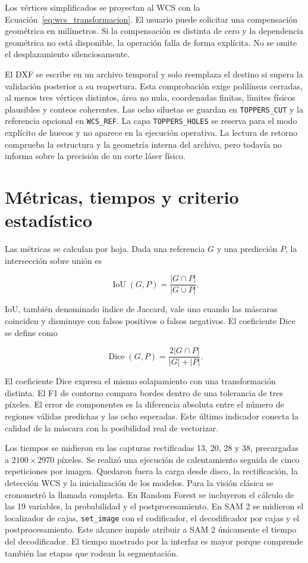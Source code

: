 Los vértices simplificados se proyectan al WCS con la Ecuación~\ref{eq:wcs_transformacion}. El usuario puede solicitar una compensación geométrica en milímetros. Si la compensación es distinta de cero y la dependencia geométrica no está disponible, la operación falla de forma explícita. No se omite el desplazamiento silenciosamente.

El DXF se escribe en un archivo temporal y solo reemplaza el destino si supera la validación posterior a su reapertura. Esta comprobación exige polilíneas cerradas, al menos tres vértices distintos, área no nula, coordenadas finitas, límites físicos plausibles y conteos coherentes. Las ocho siluetas se guardan en \texttt{TOPPERS\_CUT} y la referencia opcional en \texttt{WCS\_REF}. La capa \texttt{TOPPERS\_HOLES} se reserva para el modo explícito de huecos y no aparece en la ejecución operativa. La lectura de retorno comprueba la estructura y la geometría interna del archivo, pero todavía no informa sobre la precisión de un corte láser físico.

\section{Métricas, tiempos y criterio estadístico}

Las métricas se calculan por hoja. Dada una referencia $G$ y una predicción $P$, la intersección sobre unión es

\begin{equation}
\operatorname{IoU}(G,P)=\frac{|G\cap P|}{|G\cup P|}.
\label{eq:iou}
\end{equation}

IoU, también denominado índice de Jaccard, vale uno cuando las máscaras coinciden y disminuye con falsos positivos o falsos negativos. El coeficiente Dice se define como

\begin{equation}
\operatorname{Dice}(G,P)=\frac{2|G\cap P|}{|G|+|P|}.
\label{eq:dice}
\end{equation}

El coeficiente Dice expresa el mismo solapamiento con una transformación distinta. El F1 de contorno compara bordes dentro de una tolerancia de tres píxeles. El error de componentes es la diferencia absoluta entre el número de regiones válidas predichas y las ocho esperadas. Este último indicador conecta la calidad de la máscara con la posibilidad real de vectorizar.

Los tiempos se midieron en las capturas rectificadas 13, 20, 28 y 38, precargadas a $2100\times2970$ píxeles. Se realizó una ejecución de calentamiento seguida de cinco repeticiones por imagen. Quedaron fuera la carga desde disco, la rectificación, la detección WCS y la inicialización de los modelos. Para la visión clásica se cronometró la llamada completa. En Random Forest se incluyeron el cálculo de las 19 variables, la probabilidad y el postprocesamiento. En SAM 2 se midieron el localizador de cajas, \texttt{set\_image} con el codificador, el decodificador por cajas y el postprocesamiento. Este alcance impide atribuir a SAM 2 únicamente el tiempo del decodificador. El tiempo mostrado por la interfaz es mayor porque comprende también las etapas que rodean la segmentación.

